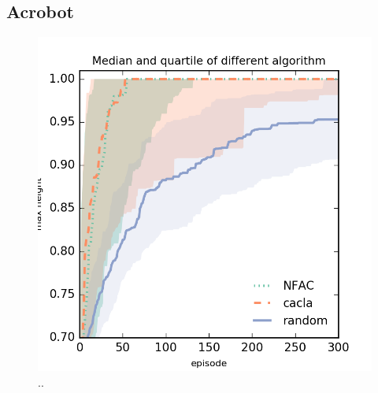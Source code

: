 
\subsection{Acrobot}

\begin{figure}[h]
	\begin{center}
		\includegraphics{result_plotting/adacrobot-1ddl.png}
		\caption{..}
		\label{image:adacrobot}
	\end{center}
\end{figure}


